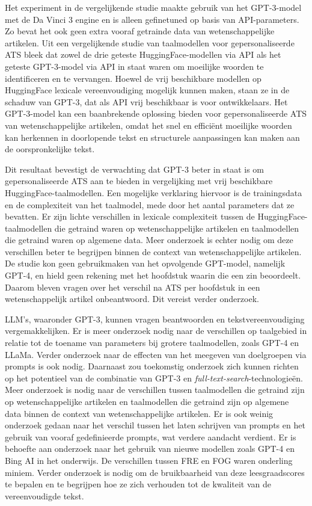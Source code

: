 Het experiment in de vergelijkende studie maakte gebruik van het GPT-3-model met de Da Vinci 3 engine en is alleen gefinetuned op basis van API-parameters. Zo bevat het ook geen extra vooraf getrainde data van wetenschappelijke artikelen. Uit een vergelijkende studie van taalmodellen voor gepersonaliseerde ATS bleek dat zowel de drie geteste HuggingFace-modellen via API als het geteste GPT-3-model via API in staat waren om moeilijke woorden te identificeren en te vervangen. Hoewel de vrij beschikbare modellen op HuggingFace lexicale vereenvoudiging mogelijk kunnen maken, staan ze in de schaduw van GPT-3, dat als API vrij beschikbaar is voor ontwikkelaars. Het GPT-3-model kan een baanbrekende oplossing bieden voor gepersonaliseerde ATS van wetenschappelijke artikelen, omdat het snel en efficiënt moeilijke woorden kan herkennen in doorlopende tekst en structurele aanpassingen kan maken aan de oorspronkelijke tekst.

Dit resultaat bevestigt de verwachting dat GPT-3 beter in staat is om gepersonaliseerde ATS aan te bieden in vergelijking met vrij beschikbare HuggingFace-taalmodellen. Een mogelijke verklaring hiervoor is de trainingsdata en de complexiteit van het taalmodel, mede door het aantal parameters dat ze bevatten. Er zijn lichte verschillen in lexicale complexiteit tussen de HuggingFace-taalmodellen die getraind waren op wetenschappelijke artikelen en taalmodellen die getraind waren op algemene data. Meer onderzoek is echter nodig om deze verschillen beter te begrijpen binnen de context van wetenschappelijke artikelen. De studie kon geen gebruikmaken van het opvolgende GPT-model, namelijk GPT-4, en hield geen rekening met het hoofdstuk waarin die een zin beoordeelt. Daarom bleven vragen over het verschil na ATS per hoofdstuk in een wetenschappelijk artikel onbeantwoord. Dit vereist verder onderzoek.

LLM's, waaronder GPT-3, kunnen vragen beantwoorden en tekstvereenvoudiging vergemakkelijken. Er is meer onderzoek nodig naar de verschillen op taalgebied in relatie tot de toename van parameters bij grotere taalmodellen, zoals GPT-4 en LLaMa. Verder onderzoek naar de effecten van het meegeven van doelgroepen via prompts is ook nodig. Daarnaast zou toekomstig onderzoek zich kunnen richten op het potentieel van de combinatie van GPT-3 en \textit{full-text-search}-technologieën. Meer onderzoek is nodig naar de verschillen tussen taalmodellen die getraind zijn op wetenschappelijke artikelen en taalmodellen die getraind zijn op algemene data binnen de context van wetenschappelijke artikelen. Er is ook weinig onderzoek gedaan naar het verschil tussen het laten schrijven van prompts en het gebruik van vooraf gedefinieerde prompts, wat verdere aandacht verdient. Er is behoefte aan onderzoek naar het gebruik van nieuwe modellen zoals GPT-4 en Bing AI in het onderwijs. De verschillen tussen FRE en FOG waren onderling miniem. Verder onderzoek is nodig om de bruikbaarheid van deze leesgraadscores te bepalen en te begrijpen hoe ze zich verhouden tot de kwaliteit van de vereenvoudigde tekst.

